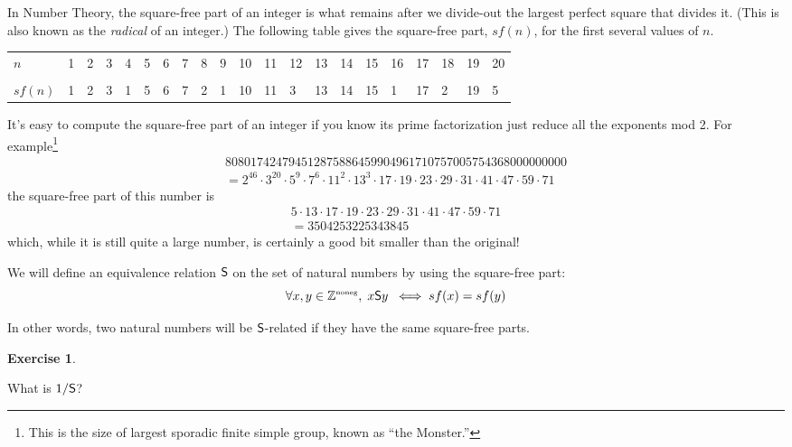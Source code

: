 \documentclass[10pt,]{book}
\theoremstyle{plain}
\theoremstyle{definition}
\theoremstyle{definition}
\newtheorem{exercise}[theorem]{Exercise}
\numberwithin{equation}{section}
\newcommand{\hrulethin}  {\noalign{\hrule height 0.04em}}
\renewcommand{\Naturals}{{\mathbb Z}^{\mbox{\tiny noneg}} }
\newcommand{\Naturals}{{\mathbb N}}
\newcommand{\relS}{\mbox{\textsf S}}
\begin{document}
    In Number Theory, the  square-free part of an integer is what remains after we divide-out
    the largest perfect square that divides it. (This is also known as the
    \emph{radical} of an integer.)
    The following table gives the
    square-free part, \(sf(n)\), for the first several values of \(n\).
\begin{tabular}{lllllllllllllllllllll}
\(n\)&1&2&3&4&5&6&7&8&9&10&11&12&13&14&15&16&17&18&19&20\tabularnewline[0pt]
&&&&&&&&&&&&&&&&&&&&\tabularnewline\hrulethin
\(sf(n)\)&1&2&3&1&5&6&7&2&1&10&11&3&13&14&15&1&17&2&19&5
\end{tabular}
\par

    It's easy to compute the square-free part of an integer if you know its prime factorization \textemdash{} just reduce all the exponents mod 2. For example\footnote{This is the size of largest 
    sporadic finite simple group, known as ``the Monster.''\label{fn-37}}
    \begin{gather*}
808017424794512875886459904961710757005754368000000000\\
= 2^{46}\cdot 3^{20}\cdot 5^9\cdot7^6\cdot 11^2\cdot 13^3\cdot 17
      \cdot 19\cdot 23\cdot 29\cdot 31\cdot 41\cdot 47\cdot 59\cdot 71
\end{gather*}
    the square-free part of this number is
    \begin{gather*}
5\cdot 13\cdot 17\cdot 19\cdot 23\cdot 29\cdot 31\cdot 41\cdot 47\cdot 59\cdot 71\\
= 3504253225343845
\end{gather*}
    which, while it is still quite a large number, is certainly a good
    bit smaller than the original!
\par

    We will define an equivalence relation \(\relS\) on the set of natural numbers
    by using the square-free part:
    \begin{equation*}
      \forall x, y \in \Naturals, \; x \relS y \; \iff sf(x) = sf(y)
    \end{equation*}
\par

    In other words, two natural numbers will be \(\relS\)-related if they have the
    same square-free parts.
\begin{exercise}\label{exercise-51}

        What is \(1/\relS\)?
\end{exercise}
\par
\end{document}

